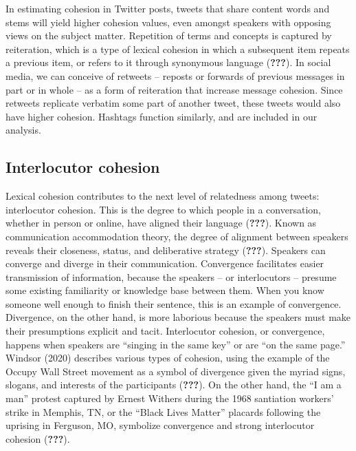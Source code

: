 \documentclass[english,man]{apa6}
\begin{document}
In estimating cohesion in Twitter posts, tweets that share content words and stems will yield higher cohesion values, even amongst speakers with opposing views on the subject matter. Repetition of terms and concepts is captured by reiteration, which is a type of lexical cohesion in which a subsequent item repeats a previous item, or refers to it through synonymous language ({\textbf{???}}). In social media, we can conceive of retweets -- reposts or forwards of previous messages in part or in whole -- as a form of reiteration that increase message cohesion. Since retweets replicate verbatim some part of another tweet, these tweets would also have higher cohesion. Hashtags function similarly, and are included in our analysis.

\hypertarget{interlocutor-cohesion}{%
\subsection{Interlocutor cohesion}\label{interlocutor-cohesion}}

Lexical cohesion contributes to the next level of relatedness among tweets: interlocutor cohesion. This is the degree to which people in a conversation, whether in person or online, have aligned their language ({\textbf{???}}). Known as communication accommodation theory, the degree of alignment between speakers reveals their closeness, status, and deliberative strategy ({\textbf{???}}). Speakers can converge and diverge in their communication. Convergence facilitates easier transmission of information, because the speakers -- or interlocutors -- presume some existing familiarity or knowledge base between them. When you know someone well enough to finish their sentence, this is an example of convergence. Divergence, on the other hand, is more laborious because the speakers must make their presumptions explicit and tacit. Interlocutor cohesion, or convergence, happens when speakers are \enquote{singing in the same key} or are \enquote{on the same page.} Windsor (2020) describes various types of cohesion, using the example of the Occupy Wall Street movement as a symbol of divergence given the myriad signs, slogans, and interests of the participants ({\textbf{???}}). On the other hand, the \enquote{I am a man} protest captured by Ernest Withers during the 1968 santiation workers' strike in Memphis, TN, or the \enquote{Black Lives Matter} placards following the uprising in Ferguson, MO, symbolize convergence and strong interlocutor cohesion ({\textbf{???}}).
\end{document}
